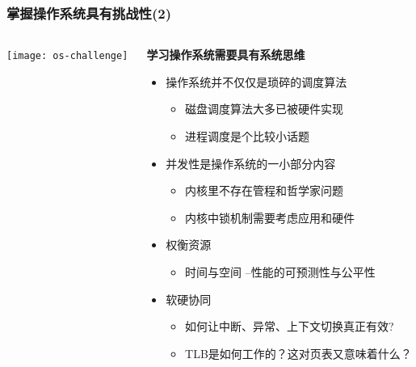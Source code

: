     
\begin{frame}
    \frametitle{掌握操作系统具有挑战性(2)}
    
        \begin{columns}
    	
    	\begin{column}{0.3\textwidth}	
    		\texttt{[image: os-challenge]}	
    	\end{column}
    
    	\begin{column}{0.7\textwidth}
    		
     \textbf{学习操作系统需要具有系统思维} 
    \begin{itemize}
        \item 操作系统并不仅仅是琐碎的调度算法
            \begin{itemize}
                \item 磁盘调度算法大多已被硬件实现
                \item 进程调度是个比较小话题
            \end{itemize} \pause
        \item 并发性是操作系统的一小部分内容
            \begin{itemize}
                \item 内核里不存在管程和哲学家问题
                \item 内核中锁机制需要考虑应用和硬件
            \end{itemize} \pause
    \end{itemize}

    \begin{itemize}
	\item 权衡资源
	\begin{itemize}
		\item 时间与空间 --性能的可预测性与公平性
	\end{itemize} \pause
	\item 软硬协同
	\begin{itemize}
		\item 如何让中断、异常、上下文切换真正有效? 
		\item TLB是如何工作的？这对页表又意味着什么？
	\end{itemize}
\end{itemize}

    \end{column}

\end{columns}

\end{frame}

